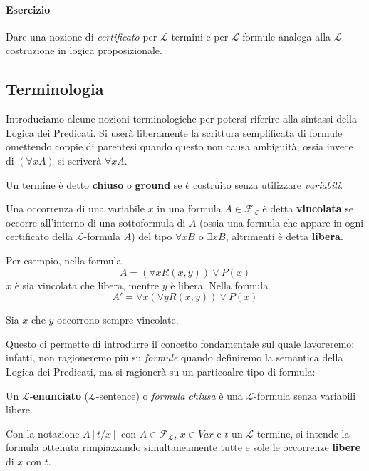 \paragraph{Esercizio} Dare una nozione di \textit{certificato} per 
$\mathscr{L}$-termini e per $\mathscr{L}$-formule analoga alla $\mathscr{L}$-costruzione in logica proposizionale. 

\subsection{Terminologia}
Introduciamo alcune nozioni terminologiche per potersi riferire alla sintassi 
della Logica dei Predicati.
Si userà liberamente la scrittura semplificata di formule omettendo coppie di parentesi
quando questo non causa ambiguità, ossia invece di $(\forall x A)$ si scriverà $\forall x A$.

\begin{defi}
Un termine è detto \textbf{chiuso} o \textbf{ground} se è costruito senza utilizzare \textit{variabili}. 
\end{defi}

\begin{defi}
Una occorrenza di una variabile $x$ in una formula $A \in \mathscr{F}_\mathscr{L}$ è detta \textbf{vincolata} se occorre all'interno di una sottoformula di $A$ (ossia una formula che appare in ogni certificato della $\mathscr{L}$-formula $A$) del tipo $\forall x B$ o $\exists x B$, altrimenti è detta \textbf{libera}.
\end{defi}

Per esempio, nella formula 
$$
A = (\forall x R(x,y)) \lor P(x)
$$
$x$ è sia vincolata che libera, mentre $y$ è libera. 
Nella formula 
$$
A' = \forall x (\forall y R(x,y)) \lor P(x)
$$

Sia $x$ che $y$ occorrono sempre vincolate. 

Questo ci permette di introdurre il concetto fondamentale sul quale lavoreremo: infatti, non ragioneremo più su \textit{formule} quando definiremo la semantica della Logica dei Predicati, ma si ragionerà su un particoalre tipo di formula: 
\begin{defi}
Un $\mathscr{L}$-\textbf{enunciato} ($\mathscr{L}$-sentence) o \textit{formula chiusa} è una $\mathscr{L}$-formula senza variabili libere.
\end{defi}

\begin{defi}[Sostituzione]
Con la notazione $A[t/x]$ con $A \in \mathscr{F}_\mathscr{L}$, $x \in Var$ e $t$ un $\mathscr{L}$-termine, si intende la formula ottenuta rimpiazzando simultaneamente tutte e sole le occorrenze \textbf{libere} di $x$ con $t$. 
\end{defi}
